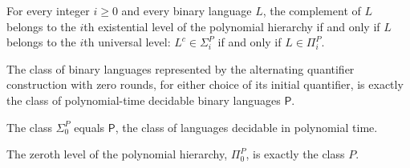 \begin{theorem}
\label{Complexity.compl_mem_SigmaP_iff}
\leanok
{}
For every integer $i\ge 0$ and every binary language $L$, the complement of $L$ belongs
to the $i$th existential level of the polynomial hierarchy if and only if $L$ belongs to
the $i$th universal level: $L^{c}\in\Sigma_i^P$ if and only if $L\in\Pi_i^P$.
\end{theorem}

\begin{theorem}
\label{Complexity.altClass_zero}
\leanok
{}
The class of binary languages represented by the alternating quantifier construction
with zero rounds, for either choice of its initial quantifier, is exactly the class of
polynomial-time decidable binary languages $\mathsf{P}$.
\end{theorem}

\begin{theorem}
\label{Complexity.SigmaP_zero}
\leanok
{}
The class $\Sigma_0^P$ equals $\mathsf{P}$, the class of languages decidable in
polynomial time.
\end{theorem}

\begin{theorem}
\label{Complexity.PiP_zero}
\leanok
{}
The zeroth level of the polynomial hierarchy, $\Pi_0^P$, is exactly the class $P$.
\end{theorem}

